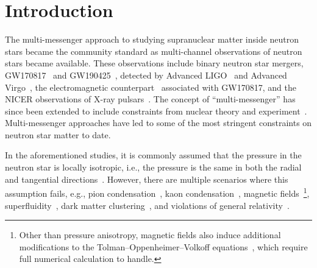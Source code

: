 \documentclass[prd,twocolumn,a4paper,floatfix,nofootinbib,preprintnumbers,superscriptaddress]{revtex4-1}
\begin{document}
\maketitle

\section{Introduction}
The multi-messenger approach to studying supranuclear matter inside neutron stars became the community standard as multi-channel observations of neutron stars became available. These observations include binary neutron star mergers, GW170817~\cite{LIGOScientific:2017vwq} and GW190425~\cite{LIGOScientific:2020aai}, detected by Advanced LIGO~\cite{LIGOScientific:2014pky} and Advanced Virgo~\cite{VIRGO:2014yos}, the electromagnetic counterpart~\cite{LIGOScientific:2017ync} associated with GW170817,  and the NICER observations of X-ray pulsars~\cite{Riley:2019yda,Miller:2019cac,Riley:2021pdl,Miller:2021qha,Vinciguerra:2023qxq,Dittmann:2024mbo,Salmi:2024aum,Mauviard:2025dmd}. The concept of ``multi-messenger'' has since been extended to include constraints from nuclear theory and experiment~\cite{Dietrich:2020efo,Huth:2021bsp,Essick:2021kjb,Legred:2021hdx,Pang:2021jta,Pang:2022rzc,Essick:2023fso,Pang:2023dqj,Tsang:2023vhh,Koehn:2024set,Legred:2025aar,Finch:2025bao}. Multi-messenger approaches have led to some of the most stringent constraints on neutron star matter to date.

In the aforementioned studies, it is commonly assumed that the pressure in the neutron star is locally isotropic, i.e., the pressure is the same in both the radial and tangential directions~\cite{Herrera:1997plx,Herrera:2020gdg}. However, there are multiple scenarios where this assumption fails, e.g., pion condensation~\cite{Sawyer:1972cq,Hartle:1974de,Sawyer:1977ja}, kaon condensation~\cite{Takatsuka:1995xn}, magnetic fields~\cite{Canuto:1968apg,Bocquet:1995je,Konno:1999zv,Weber:2006ep,Ciolfi:2010td,Gualtieri:2010md,Doneva:2012rd,Frieben:2012dz,Bucciantini:2014uia,Pili:2017yxd,Patra:2020wjy,Bordbar:2022qhl}\footnote{Other than pressure anisotropy, magnetic fields also induce additional modifications to the Tolman–Oppenheimer–Volkoff equations~\cite{Chatterjee:2018prm}, which require full numerical calculation to handle.}, superfluidity~\cite{Letelier:1980mxb,Herrera:1997plx}, dark matter clustering~\cite{Liu:2025cwy}, and violations of general relativity~\cite{Glampedakis:2015sua,daSilva:2024qex}.
\end{document}
